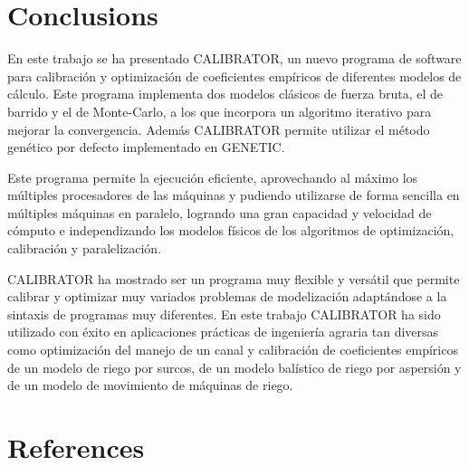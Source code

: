 \documentclass[review,authoryear]{elsarticle}
\begin{document}
\section{Conclusions}

En este trabajo se ha presentado CALIBRATOR, un nuevo programa de software para
calibración y optimización de coeficientes empíricos de diferentes modelos de
cálculo. Este programa implementa dos modelos clásicos de fuerza bruta, el de
barrido y el de Monte-Carlo, a los que incorpora un algoritmo iterativo para
mejorar la convergencia. Además CALIBRATOR permite utilizar el método genético
por defecto implementado en GENETIC.

Este programa permite la ejecución eficiente, aprovechando al máximo los
múltiples procesadores de las máquinas y pudiendo utilizarse de forma sencilla
en múltiples máquinas en paralelo, logrando una gran capacidad y velocidad de
cómputo e independizando los modelos físicos de los algoritmos de optimización,
calibración y paralelización.

CALIBRATOR ha mostrado ser un programa muy flexible y versátil que permite
calibrar y optimizar muy variados problemas de modelización adaptándose a la
sintaxis de programas muy diferentes. En este trabajo CALIBRATOR ha sido
utilizado con éxito en aplicaciones prácticas de ingeniería agraria tan diversas
como optimización del manejo de un canal y calibración de coeficientes empíricos
de un modelo de riego por surcos, de un modelo balístico de riego por aspersión
y de un modelo de movimiento de máquinas de riego.

\section*{References}

\end{document}
